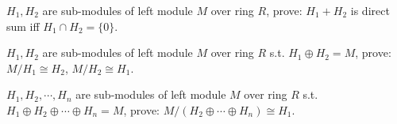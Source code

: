 \documentclass{ctexart}
\newif\ifpreface
\begin{document}
\large
\setlength{\baselineskip}{1.2em}
\ifpreface

\newgeometry{left=2cm,right=2cm,top=2cm,bottom=2cm}
\else
{}
\maketitle
\fi
\begin{problem}
$H_1,H_2$ are sub-modules of left module $M$ over ring $R$, prove: $H_1+H_2$ is direct sum iff $H_1\cap H_2=\{0\}$.
\end{problem}
\begin{problem}\label{pro:2}
$H_1,H_2$ are sub-modules of left module $M$ over ring $R$ s.t. $H_1\oplus H_2=M$, prove: $M/H_1\cong H_2$, $M/H_2\cong H_1$.
\end{problem}
\begin{problem}
$H_1,H_2, \cdots ,H_n$ are sub-modules of left module $M$ over ring $R$ s.t. $H_1\oplus H_2\oplus\cdots\oplus H_n=M$, prove: $M/(H_2\oplus\cdots\oplus H_n)\cong H_1$.
\end{problem}
\end{document}
